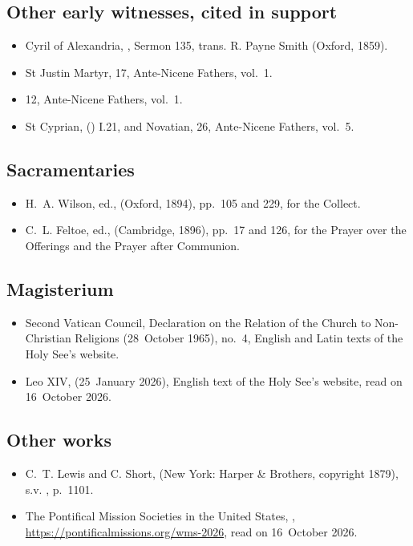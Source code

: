 {\subsection*{Other early witnesses, cited in support}
\begin{itemize}[itemsep=0pt,topsep=.25em]
\item Cyril of Alexandria, , Sermon 135, trans. R. Payne Smith (Oxford, 1859).
\item St Justin Martyr,  17, Ante-Nicene Fathers, vol.~1.
\item {} 12, Ante-Nicene Fathers, vol.~1.
\item St Cyprian,  () I.21, and Novatian,  26, Ante-Nicene Fathers, vol.~5.
\end{itemize}

\subsection*{Sacramentaries}
\begin{itemize}[itemsep=0pt,topsep=.25em]
\item H.~A. Wilson, ed.,  (Oxford, 1894), pp.~105 and 229, for the Collect.
\item C.~L. Feltoe, ed.,  (Cambridge, 1896), pp.~17 and 126, for the Prayer over the Offerings and the Prayer after Communion.
\end{itemize}

\subsection*{Magisterium}
\begin{itemize}[itemsep=0pt,topsep=.25em]
\item Second Vatican Council, Declaration on the Relation of the Church to Non-Christian Religions  (28~October 1965), no.~4, English and Latin texts of the Holy See's website.
\item Leo XIV,  (25~January 2026), English text of the Holy See's website, read on 16~October 2026.
\end{itemize}

\subsection*{Other works}
\begin{itemize}[itemsep=0pt,topsep=.25em]
\item C.~T. Lewis and C. Short,  (New York: Harper \& Brothers, copyright 1879), s.v. , p.~1101.
\item The Pontifical Mission Societies in the United States, , \url{https://pontificalmissions.org/wms-2026}, read on 16~October 2026.
\end{itemize}

}
